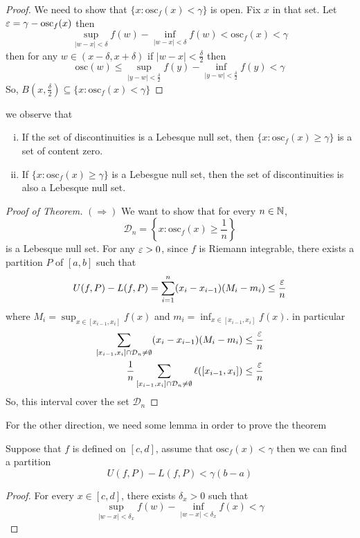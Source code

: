 \begin{proof}
  We need to show that $\{x : \mathrm{osc}_f(x) < \gamma\}$ is open. Fix $x$ in that set.
  Let $\varepsilon = {\gamma - \mathrm{osc}_f(x)}$ then 
  \[\sup_{|w-x|< \delta} f(w) - \inf_{|w-x| < \delta} f(w) < \mathrm{osc}_f(x) <\gamma \]
  then for any $w \in (x - \delta, x + \delta)$ if $|w - x| < \frac\delta2$ then
  \[\mathrm{osc}(w) \leq \sup_{|y - w|<\frac\delta2} f(y) - \inf_{|y-w| < \frac\delta2} f(y) < \gamma\]
  So, $B\left(x, \frac\delta2\right) \subseteq \{x : \mathrm{osc}_f(x) < \gamma\}$
\end{proof}
we observe that 
  \begin{enumerate}[(i)]
    \item If the set of discontinuities is a Lebesque null set, then 
    $\{x : \mathrm{osc}_f(x) \ge \gamma\}$ is a set of content zero. 
    \item If $\{x : \mathrm{osc}_f(x) \ge \gamma\}$ is a Lebesgue null set, then
    the set of discontinuities is also a Lebesque null set.
  \end{enumerate}

\begin{proof}[Proof of Theorem]
  $(\Rightarrow)$ We want to show that for every $n \in \mathbb N$, 
  \[\mathcal{D}_n = \left\{x : \mathrm{osc}_f(x) \ge \frac1n\right\}\]
  is a Lebesque null set. For any $\varepsilon > 0$, since $f$ is Riemann integrable, 
  there exists a partition $P$ of $[a, b]$ such that 
  \[U(f, P) - L(f, P) = \sum_{i = 1}^n (x_i - x_{i-1})(M_i - m_i) \le \frac{\varepsilon} n\]
  where $M_i = \sup_{x\in[x_{i-1}, x_i]}f(x)$ and $m_i = \inf_{x\in[x_{i-1}, x_i]}f(x)$.
  in particular
  \begin{align*}
    \sum_{[x_{i-1}, x_i]\cap \mathcal{D}_n \neq \emptyset}(x_i - x_{i-1})(M_i - m_i) &\le \frac{\varepsilon} n\\
    \frac1n\sum_{[x_{i-1}, x_i]\cap \mathcal{D}_n \neq \emptyset} \ell([x_{i-1}, x_i]) &\le \frac{\varepsilon} n
  \end{align*}
  So, this interval cover the set $\mathcal{D}_n$
\end{proof}
For the other direction, we need some lemma in order to prove the theorem
\begin{lemma}
  Suppose that $f$ is defined on $[c, d]$, assume that $\mathrm{osc}_f(x) < \gamma$
  then we can find a partition 
  \[U(f, P) - L(f, P) < \gamma(b-a)\]
\end{lemma}
\begin{proof}
  For every $x \in [c, d]$, there exists $\delta_x > 0$ such that
  \[\sup_{|w-x| < \delta_x} f(w) - \inf_{|w-x| < \delta_x} f(x) < \gamma\]
\end{proof}